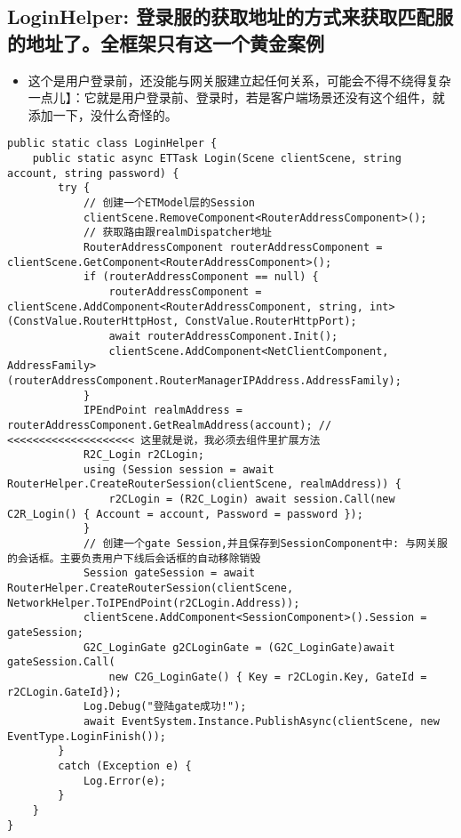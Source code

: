 \documentclass[9pt, b5paper]{article}
\begin{document}
\subsection{LoginHelper: 登录服的获取地址的方式来获取匹配服的地址了。全框架只有这一个黄金案例}
\label{sec-2-12}
\begin{itemize}
\item 这个是用户登录前，还没能与网关服建立起任何关系，可能会不得不绕得复杂一点儿】：它就是用户登录前、登录时，若是客户端场景还没有这个组件，就添加一下，没什么奇怪的。
\end{itemize}
\begin{verbatim}
public static class LoginHelper {
    public static async ETTask Login(Scene clientScene, string account, string password) {
        try {
            // 创建一个ETModel层的Session
            clientScene.RemoveComponent<RouterAddressComponent>();
            // 获取路由跟realmDispatcher地址
            RouterAddressComponent routerAddressComponent = clientScene.GetComponent<RouterAddressComponent>();
            if (routerAddressComponent == null) {
                routerAddressComponent = clientScene.AddComponent<RouterAddressComponent, string, int>(ConstValue.RouterHttpHost, ConstValue.RouterHttpPort);
                await routerAddressComponent.Init();
                clientScene.AddComponent<NetClientComponent, AddressFamily>(routerAddressComponent.RouterManagerIPAddress.AddressFamily);
            }
            IPEndPoint realmAddress = routerAddressComponent.GetRealmAddress(account); // <<<<<<<<<<<<<<<<<<<< 这里就是说，我必须去组件里扩展方法
            R2C_Login r2CLogin;
            using (Session session = await RouterHelper.CreateRouterSession(clientScene, realmAddress)) {
                r2CLogin = (R2C_Login) await session.Call(new C2R_Login() { Account = account, Password = password });
            }
            // 创建一个gate Session,并且保存到SessionComponent中: 与网关服的会话框。主要负责用户下线后会话框的自动移除销毁
            Session gateSession = await RouterHelper.CreateRouterSession(clientScene, NetworkHelper.ToIPEndPoint(r2CLogin.Address));
            clientScene.AddComponent<SessionComponent>().Session = gateSession;
            G2C_LoginGate g2CLoginGate = (G2C_LoginGate)await gateSession.Call(
                new C2G_LoginGate() { Key = r2CLogin.Key, GateId = r2CLogin.GateId});
            Log.Debug("登陆gate成功!");
            await EventSystem.Instance.PublishAsync(clientScene, new EventType.LoginFinish());
        }
        catch (Exception e) {
            Log.Error(e);
        }
    } 
}
\end{verbatim}
\end{document}

